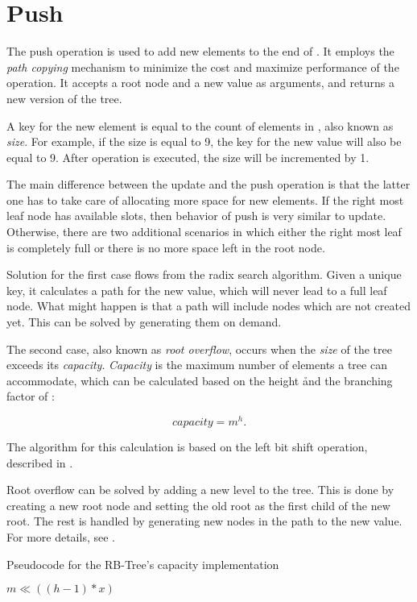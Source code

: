 \section{Push} 
The push operation is used to add new elements to the end of \rbtree. It employs the \emph{path copying} mechanism to minimize the cost and maximize performance of the operation. It accepts a root node and a new value as arguments, and returns a new version of the tree. 

A key for the new element is equal to the count of elements in \rbtree, also known as \emph{size}. For example, if the size is equal to 9, the key for the new value will also be equal to 9. After operation is executed, the size will be incremented by 1. 

The main difference between the update and the push operation is that the latter one has to take care of allocating more space for new elements. If the right most leaf node has available slots, then behavior of push is very similar to update. Otherwise, there are two additional scenarios in which either the right most leaf is completely full or there is no more space left in the root node. 

Solution for the first case flows from the radix search algorithm. Given a unique key, it calculates a path for the new value, which will never lead to a full leaf node. What might happen is that a path will include nodes which are not created yet. This can be solved by generating them on demand. 

The second case, also known as \emph{root overflow}, occurs when the \emph{size} of the tree exceeds its \emph{capacity}. \emph{Capacity} is the maximum number of elements a tree can accommodate, which can be calculated based on the height \h and the branching factor \m of \rbtree:

\begin{equation}
	capacity = m^h.
\end{equation}

The algorithm for this calculation is based on the left bit shift operation, described in . 

Root overflow can be solved by adding a new level to the tree. This is done by creating a new root node and setting the old root as the first child of the new root. The rest is handled by generating new nodes in the path to the new value. For more details, see . 

\begin{listing}[ht!]        
    \caption{Pseudocode for the RB-Tree's capacity implementation}
    \label{lst:rb-tree-capacity}
    
    \begin{algorithmic}
		\State \Return $m \ll ((h - 1) * x)$
        \EndFunction
    \end{algorithmic}
\end{listing}

